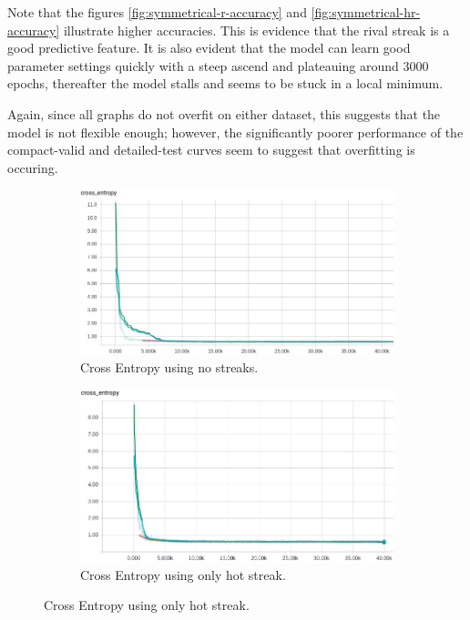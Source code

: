 \documentclass{article} %
\begin{document}
Note that the figures \ref{fig:symmetrical-r-accuracy} and \ref{fig:symmetrical-hr-accuracy} illustrate higher accuracies.
This is evidence that the rival streak is a good predictive feature.
It is also evident that the model can learn good parameter settings quickly with a steep ascend and plateauing around 3000 epochs, thereafter the model stalls and seems to be stuck in a local minimum.

Again, since all graphs do not overfit on either dataset, this suggests that the model is not flexible enough; however, the significantly poorer performance of the compact-valid and detailed-test curves seem to suggest that overfitting is occuring.



\begin{figure}[!htb]
  \begin{subfigure}{0.5\textwidth}
    \includegraphics[width=\linewidth]{plots/model1/symmetrical/streak-/crossentropy.png}
    \caption{Cross Entropy using no streaks.}\label{fig:symmetrical--crossentropy}
  \end{subfigure}
  \begin{subfigure}{0.5\textwidth}
    \includegraphics[width=\linewidth]{plots/model1/symmetrical/streak-h/crossentropy.png}
    \caption{Cross Entropy using only hot streak.}\label{fig:symmetrical-h-crossentropy}
  \end{subfigure}



\end{figure}
\end{document}
